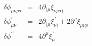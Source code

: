 \begin{equation}
  \begin{array}{rcl}
  \delta \phi_{\mu\nu\rho\sigma} &=& 4 \partial_{( \mu} 
\xi_{\nu\rho\sigma )} \\
  \delta \phi^{\prime}_{\mu\nu} &=& 2 \partial_{( \mu} 
\xi^{\,\prime}_{\nu )} +2 \partial^{\rho} \xi_{\mu\nu\rho} \\
  \delta \phi^{\prime\prime} &=& 4 \partial^{\mu} \xi^{\,\prime}_{\mu}
  \end{array}
\label{eq:c2}
\end{equation}

